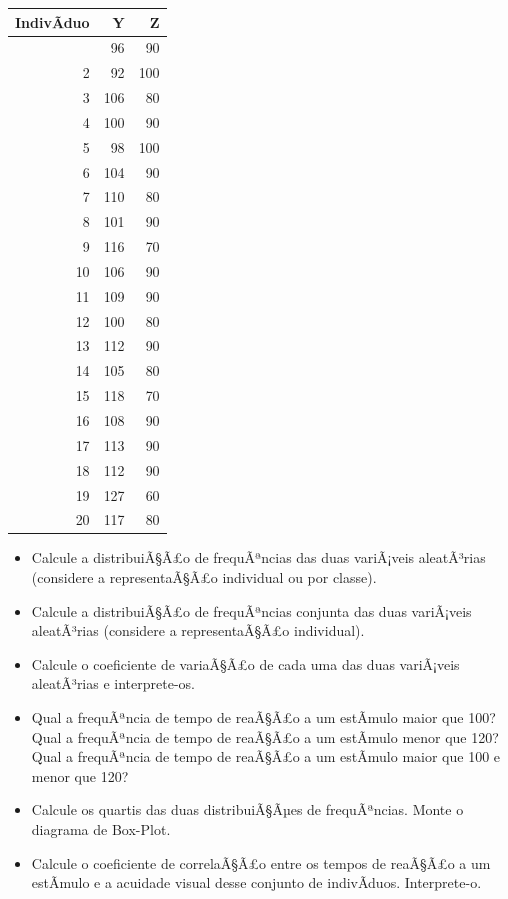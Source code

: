﻿\documentclass[11pt]{article}
\providecommand{\tightlist}{%
      \setlength{\itemsep}{0pt}\setlength{\parskip}{0pt}}
\begin{document}
{\def\LTcaptype{table} %
\begin{longtable}[]{@{}rrr@{}}
\toprule\noalign{}
IndivÃ­duo & Y & Z \\
\midrule\noalign{}
\endhead
\bottomrule\noalign{}
\endlastfoot
1 & 96 & 90 \\
2 & 92 & 100 \\
3 & 106 & 80 \\
4 & 100 & 90 \\
5 & 98 & 100 \\
6 & 104 & 90 \\
7 & 110 & 80 \\
8 & 101 & 90 \\
9 & 116 & 70 \\
10 & 106 & 90 \\
11 & 109 & 90 \\
12 & 100 & 80 \\
13 & 112 & 90 \\
14 & 105 & 80 \\
15 & 118 & 70 \\
16 & 108 & 90 \\
17 & 113 & 90 \\
18 & 112 & 90 \\
19 & 127 & 60 \\
20 & 117 & 80 \\
\end{longtable}
}

\begin{itemize}
\tightlist
\item
  Calcule a distribuiÃ§Ã£o de frequÃªncias das duas variÃ¡veis aleatÃ³rias
  (considere a representaÃ§Ã£o individual ou por classe).
\item
  Calcule a distribuiÃ§Ã£o de frequÃªncias conjunta das duas variÃ¡veis
  aleatÃ³rias (considere a representaÃ§Ã£o individual).\\
\item
  Calcule o coeficiente de variaÃ§Ã£o de cada uma das duas variÃ¡veis
  aleatÃ³rias e interprete-os.\\
\item
  Qual a frequÃªncia de tempo de reaÃ§Ã£o a um estÃ­mulo maior que 100? Qual
  a frequÃªncia de tempo de reaÃ§Ã£o a um estÃ­mulo menor que 120? Qual a
  frequÃªncia de tempo de reaÃ§Ã£o a um estÃ­mulo maior que 100 e menor que
  120?\\
\item
  Calcule os quartis das duas distribuiÃ§Ãµes de frequÃªncias. Monte o
  diagrama de Box-Plot.\\
\item
  Calcule o coeficiente de correlaÃ§Ã£o entre os tempos de reaÃ§Ã£o a um
  estÃ­mulo e a acuidade visual desse conjunto de indivÃ­duos.
  Interprete-o.
\end{itemize}
\end{document}
